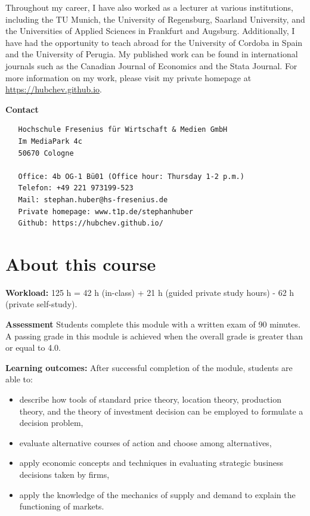 \documentclass[
  12pt,
  oneside]{book}
\providecommand{\tightlist}{%
  \setlength{\itemsep}{0pt}\setlength{\parskip}{0pt}}
\theoremstyle{definition}
\theoremstyle{definition}
\theoremstyle{definition}
\theoremstyle{definition}
\theoremstyle{remark}
\begin{document}
Throughout my career, I have also worked as a lecturer at various institutions, including the TU Munich, the University of Regensburg, Saarland University, and the Universities of Applied Sciences in Frankfurt and Augsburg. Additionally, I have had the opportunity to teach abroad for the University of Cordoba in Spain and the University of Perugia. My published work can be found in international journals such as the Canadian Journal of Economics and the Stata Journal. For more information on my work, please visit my private homepage at \url{https://hubchev.github.io}.

\textbf{Contact}

\begin{verbatim}
   Hochschule Fresenius für Wirtschaft & Medien GmbH
   Im MediaPark 4c
   50670 Cologne
   
   Office: 4b OG-1 Bü01 (Office hour: Thursday 1-2 p.m.)
   Telefon: +49 221 973199-523
   Mail: stephan.huber@hs-fresenius.de
   Private homepage: www.t1p.de/stephanhuber
   Github: https://hubchev.github.io/
\end{verbatim}

\section*{About this course}\label{about-this-course}

\textbf{Workload:}
125 h = 42 h (in-class) + 21 h (guided private study hours) - 62 h (private self-study).

\textbf{Assessment}
Students complete this module with a written exam of 90 minutes. A passing grade in this module is achieved when the overall grade is greater than or equal to 4.0.

\textbf{Learning outcomes:}
After successful completion of the module, students are able to:

\begin{itemize}
\tightlist
\item
  describe how tools of standard price theory, location theory, production theory, and the theory of investment decision can be employed to formulate a decision problem,
\item
  evaluate alternative courses of action and choose among alternatives,
\item
  apply economic concepts and techniques in evaluating strategic business decisions taken by firms,
\item
  apply the knowledge of the mechanics of supply and demand to explain the functioning of markets.
\end{itemize}
\end{document}
